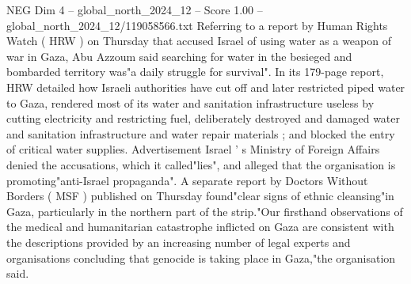 \begin{textsample}{NEG Dim 4 – global\_north\_2024\_12 – Score 1.00 – global\_north\_2024\_12/119058566.txt}
Referring to a report by Human Rights Watch ( HRW ) on Thursday that accused Israel of using water as a weapon of war in Gaza, Abu Azzoum said searching for water in the besieged and bombarded territory was"a daily struggle for survival".
In its 179-page report, HRW detailed how Israeli authorities have cut off and later restricted piped water to Gaza, rendered most of its water and sanitation infrastructure useless by cutting electricity and restricting fuel, deliberately destroyed and damaged water and sanitation infrastructure and water repair materials ; and blocked the entry of critical water supplies.
Advertisement Israel ' s Ministry of Foreign Affairs denied the accusations, which it called"lies", and alleged that the organisation is promoting"anti-Israel propaganda".
A separate report by Doctors Without Borders ( MSF ) published on Thursday found"clear signs of ethnic cleansing"in Gaza, particularly in the northern part of the strip."Our firsthand observations of the medical and humanitarian catastrophe inflicted on Gaza are consistent with the descriptions provided by an increasing number of legal experts and organisations concluding that genocide is taking place in Gaza,"the organisation said.

\end{textsample}
